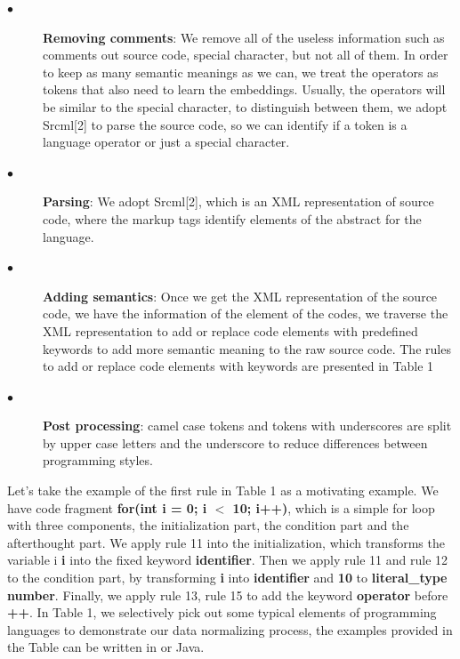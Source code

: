 \begin{description}
	\item [$\bullet$] \textbf{Removing comments}: We remove all of the useless information such as comments out source code, special character, but not all of them. In order to keep as many semantic meanings as we can, we treat the operators as tokens that also need to learn the embeddings. Usually, the operators will be similar to the special character, to distinguish between them, we adopt Srcml[2] to parse the source code, so we can identify if a token is a language operator or just a special character.
	\item [$\bullet$] \textbf{Parsing}: We adopt Srcml[2], which is an XML representation of source code, where the markup tags identify elements of the abstract for the language.
	\item [$\bullet$] \textbf{Adding semantics}: Once we get the XML representation of the source code, we have the information of the element of the codes, we traverse the XML representation to add or replace code elements with predefined keywords to add more semantic meaning to the raw source code. The rules to add or replace code elements with keywords are presented in Table 1
	\item [$\bullet$] \textbf{Post processing}: camel case tokens and tokens with underscores are split by upper case letters and the underscore to reduce differences between programming styles.
\end{description}
Let's take the example of the first rule in Table 1 as a motivating example. We have code fragment \textbf{for(int i = 0; i $<$ 10; i++)}, which is a simple for loop with three components, the initialization part, the condition part and the afterthought part. We apply rule 11 into the initialization, which transforms the variable i \textbf{i} into the fixed keyword \textbf{identifier}. Then we apply rule 11 and rule 12 to the condition part, by transforming \textbf{i} into \textbf{identifier} and \textbf{10} to \textbf{literal\_type number}. Finally, we apply rule 13, rule 15 to add the keyword \textbf{operator} before \textbf{++}. In Table 1, we selectively pick out some typical elements of programming languages to demonstrate our data normalizing process, the examples provided in the Table can be written in  or Java. 

